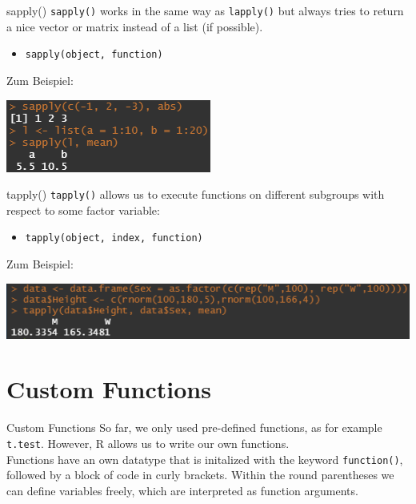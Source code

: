\documentclass[xcolor=dvipsnames, aspectratio = 169]{beamer}
\begin{document}
\begin{frame}[fragile]{sapply()}
	\verb+sapply()+ works in the same way as \verb+lapply()+ but always tries to return a nice vector or matrix instead of a list (if possible).
	\begin{itemize}
		\item \verb+sapply(object, function)+
	\end{itemize}
	Zum Beispiel:\\
	\begin{center}
		\includegraphics{sapply}
	\end{center}
\end{frame}

\begin{frame}[fragile]{tapply()}
	\verb+tapply()+ allows us to execute functions on different subgroups with respect to some factor variable:
	\begin{itemize}
		\item \verb+tapply(object, index, function)+
	\end{itemize}
	Zum Beispiel:\\
	\begin{center}
		\includegraphics{tapply}
	\end{center}
\end{frame}

\section{Custom Functions}

\begin{frame}[fragile]{Custom Functions}
    So far, we only used pre-defined functions, as for example \verb+t.test+. However, \textsf R allows us to write our own functions. \bigskip \\
Functions have an own datatype that is initalized with the keyword \verb+function()+, followed by a block of code in curly brackets. Within the round parentheses we can define variables freely, which are interpreted as function arguments.
\end{frame}
\end{document}
